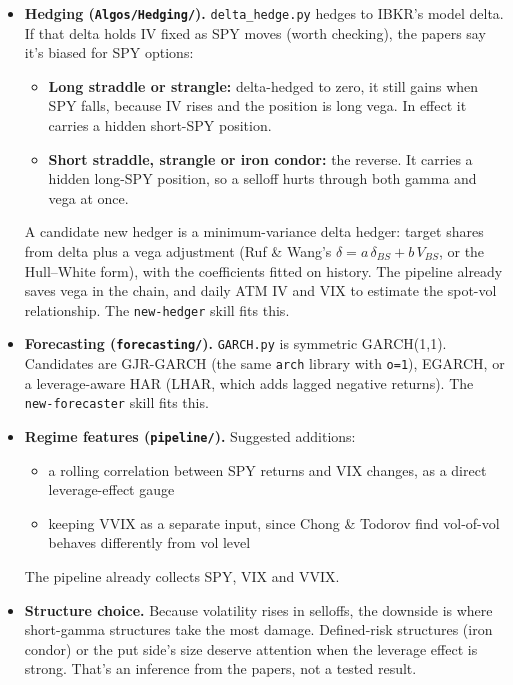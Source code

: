 \documentclass{article}
\begin{document}
\begin{itemize}

\item \textbf{Hedging (\texttt{Algos/\allowbreak{}Hedging/\allowbreak{}}).} \texttt{delta\_\allowbreak{}hedge.\allowbreak{}py} hedges to IBKR's model delta. If that delta holds IV fixed as SPY moves (worth checking), the papers say it's biased for SPY options:

\begin{itemize}

\item \textbf{Long straddle or strangle:} delta-hedged to zero, it still gains when SPY falls, because IV rises and the position is long vega. In effect it carries a hidden short-SPY position.

\item \textbf{Short straddle, strangle or iron condor:} the reverse. It carries a hidden long-SPY position, so a selloff hurts through both gamma and vega at once.

\end{itemize}

A candidate new hedger is a minimum-variance delta hedger: target shares from delta plus a vega adjustment (Ruf \& Wang's $\delta = a\,\delta_{BS} + b\,V_{BS}$, or the Hull--White form), with the coefficients fitted on history. The pipeline already saves vega in the chain, and daily ATM IV and VIX to estimate the spot-vol relationship. The \texttt{new-\allowbreak{}hedger} skill fits this.

\item \textbf{Forecasting (\texttt{forecasting/\allowbreak{}}).} \texttt{GARCH.\allowbreak{}py} is symmetric GARCH(1,1). Candidates are GJR-GARCH (the same \texttt{arch} library with \texttt{o=1}), EGARCH, or a leverage-aware HAR (LHAR, which adds lagged negative returns). The \texttt{new-\allowbreak{}forecaster} skill fits this.

\item \textbf{Regime features (\texttt{pipeline/\allowbreak{}}).} Suggested additions:

\begin{itemize}

\item a rolling correlation between SPY returns and VIX changes, as a direct leverage-effect gauge

\item keeping VVIX as a separate input, since Chong \& Todorov find vol-of-vol behaves differently from vol level

\end{itemize}

The pipeline already collects SPY, VIX and VVIX.

\item \textbf{Structure choice.} Because volatility rises in selloffs, the downside is where short-gamma structures take the most damage. Defined-risk structures (iron condor) or the put side's size deserve attention when the leverage effect is strong. That's an inference from the papers, not a tested result.

\end{itemize}
\end{document}
